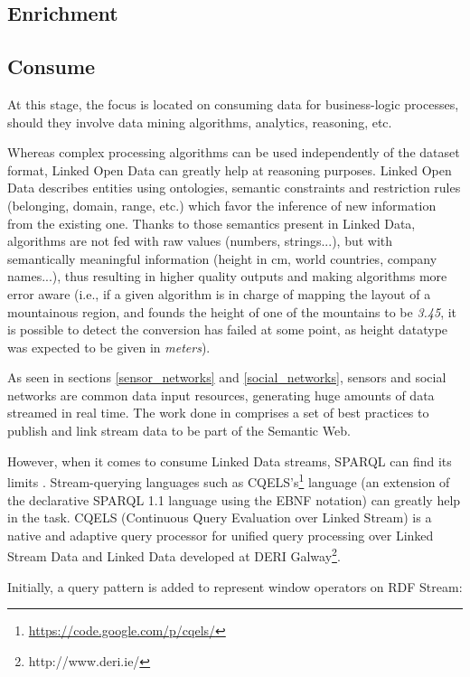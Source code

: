 \subsection{Enrichment}

\subsection{Consume}

At this stage, the focus is located on consuming data for business-logic processes, should they involve data mining algorithms, analytics, reasoning, etc.

Whereas complex processing algorithms can be used independently of the dataset format, Linked Open Data can greatly help at reasoning purposes. Linked Open Data describes entities using ontologies, semantic constraints and restriction rules (belonging, domain, range, etc.) which favor the inference of new information from the existing one. Thanks to those semantics present in Linked Data, algorithms are not fed with raw values (numbers, strings...), but with semantically meaningful information (height in cm, world countries, company names...), thus resulting in higher quality outputs and making algorithms more error aware (i.e., if a given algorithm is in charge of mapping the layout of a mountainous region, and founds the height of one of the mountains to be \textit{3.45}, it is possible to detect the conversion has failed at some point, as height datatype was expected to be given in \textit{meters}).

As seen in sections \ref{sensor_networks} and \ref{social_networks}, sensors and social networks are common data input resources, generating huge amounts of data streamed in real time. The work done in \cite{sequeda2009linked} comprises a set of best practices to publish and link stream data to be part of the Semantic Web.

However, when it comes to consume Linked Data streams, SPARQL can find its limits \cite{della2009s}. Stream-querying languages such as CQELS's\footnote{\url{https://code.google.com/p/cqels/}} language (an extension of the declarative SPARQL 1.1 language using the EBNF notation) can greatly help in the task. CQELS\cite{le2011native} (Continuous Query Evaluation over Linked Stream) is a native and adaptive query processor for unified query processing over Linked Stream Data and Linked Data developed at DERI Galway\footnote{http://www.deri.ie/}.

Initially, a query pattern is added to represent window operators on RDF Stream:

